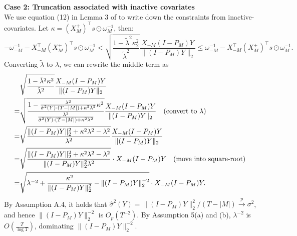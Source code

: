 \documentclass[11pt]{article}
\newcommand{\q}{\text{\quad}}
\begin{document}
\begin{enumerate}
		\textbf{Case 2: Truncation associated with inactive covariates}\\
		We use equation (12) in Lemma 3 of \cite{tian2017selective} to write down the constraints from inactive-covariates. Let $\kappa= 
		(X_M^+)^\top s\odot\omega^{-1}_{M}$, then:
		\begin{equation}\label{eq-truncation-import}
			-\omega_{-M}^{-1}-X_{-M}^\top (X_M^+)^\top s\odot \omega_{M}^{-1}<\sqrt{\frac{1-\tilde{\lambda}^2\kappa^2_2}{\tilde{\lambda}^2}}\frac{X_{-M}(I-P_M)Y}{\|(I-P_M)Y\|_2}
			\leq 	\omega_{-M}^{-1}-X_{-M}^\top (X_M^+)^\top s\odot \omega_{M}^{-1}.
		\end{equation}
		Converting $\tilde{\lambda}$ to $\lambda$, we can rewrite the middle term as
		\begin{equation}
			\begin{split}
				&	\sqrt{\frac{1-\tilde{\lambda}^2\kappa^2}{\tilde{\lambda}^2}}\frac{X_{-M}(I-P_M)Y}{\|(I-P_M)Y\|_2}\\
				=	&\sqrt{\frac{1-	\frac{\lambda^2}{\hat{\sigma}^2(Y)\cdot (T-|M|)+\kappa^2\lambda^2}\kappa^2}{	\frac{\lambda^2}{\hat{\sigma}^2(Y)\cdot (T-|M|)+\kappa^2\lambda^2}}}\frac{X_{-M}(I-P_M)Y}{\|(I-P_M)Y\|_2}\q\text{(convert to $\lambda$)}\\
				=	&\sqrt{\frac{\|(I-P_M)Y\|_2^2+\kappa^2\lambda^2-\lambda^2}{\lambda^2}}\frac{X_{-M}(I-P_M)Y}{\|(I-P_M)Y\|_2}\\
				=	&\sqrt{\frac{\|(I-P_M)Y\|_2^2+\kappa^2\lambda^2-\lambda^2}{\|(I-P_M)Y\|_2^2\lambda^2}}\cdot X_{-M}(I-P_M)Y\q\text{(move into square-root)}\\
				=		&\sqrt{\lambda^{-2}+\frac{\kappa^2}{\|(I-P_M)Y\|_2^2}-\|(I-P_M)Y\|_2^{-2}}\cdot X_{-M}(I-P_M)Y.
			\end{split}
		\end{equation}
		By Assumption A.4, it holds that $\hat{\sigma}^2(Y)=\|(I-P_M)Y\|_2^2/(T-|M|)\stackrel{p}{\to}\sigma^2$, and hence $\|(I-P_M)Y\|_2^{-2}$ is $O_p(T^{-2})$. By Assumption 5(a) and (b), $\lambda^{-2}$ is $O(\frac{T}{\log T})$, dominating $\|(I-P_M)Y\|_2^{-2}$.
	

\end{enumerate}
\end{document}
